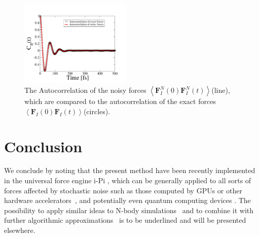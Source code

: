 \documentclass[format=acmsmall,review,timestamp,urlbreakonhyphens]{acmart}
\begin{document}
\begin{figure}%
\begin{center}
\includegraphics[width=0.475\textwidth]
{figures/AutocorrelationPlot_n.pdf}
\end{center}
\caption{\label{Fig4}
The Autocorrelation of the noisy forces \(
\left \langle \textbf{F}_{I}^{N}\left ( 0 \right ) \textbf{F}_{I}^{N}\left ( t \right )\right \rangle \)(line), which are compared to the autocorrelation of the exact forces \( \left \langle \textbf{F}_{I}\left ( 0 \right ) \textbf{F}_{I}\left ( t \right )\right \rangle \)(circles).
} \end{figure}


\section{Conclusion}
\label{sec:conclusion}
We conclude by noting that the present method have been recently implemented in the universal force engine i-Pi \cite{iPi}, which can be generally applied to all sorts of forces affected by stochastic noise such as those computed by GPUs or other hardware accelerators~\cite{HOOMD, NAMD, OpenMM, HalMD, Lammps, Amber, Gromacs}, and potentially even quantum computing devices \cite{Steane, Knill, Blatt, Chow}. The possibility to apply similar ideas to N-body simulations~\cite{White, Makino} and to combine it with further algorithmic approximations~\cite{LassAC} is to be underlined and will be presented elsewhere.
\end{document}
